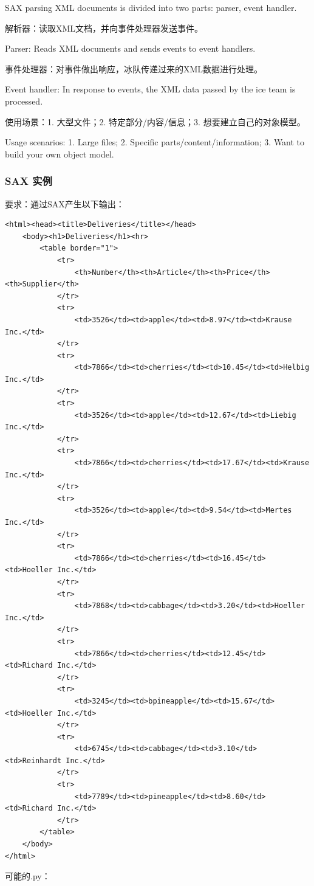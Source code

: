 \documentclass[fontset=windows]{article}
\begin{document}
SAX parsing XML documents is divided into two parts: parser, event handler.

解析器：读取XML文档，并向事件处理器发送事件。

Parser: Reads XML documents and sends events to event handlers.

事件处理器：对事件做出响应，冰队传递过来的XML数据进行处理。

Event handler: In response to events, the XML data passed by the ice team is processed.

使用场景：1. 大型文件；2. 特定部分/内容/信息；3. 想要建立自己的对象模型。

Usage scenarios: 1. Large files; 2. Specific parts/content/information; 3. Want to build your own object model.

\subsubsection{SAX 实例}

要求：通过SAX产生以下输出：

\begin{verbatim}
<html><head><title>Deliveries</title></head>
	<body><h1>Deliveries</h1><hr>
		<table border="1">
			<tr>
				<th>Number</th><th>Article</th><th>Price</th><th>Supplier</th>
			</tr>
			<tr>
				<td>3526</td><td>apple</td><td>8.97</td><td>Krause Inc.</td>
			</tr>
			<tr>
				<td>7866</td><td>cherries</td><td>10.45</td><td>Helbig Inc.</td> 
			</tr>
			<tr>
				<td>3526</td><td>apple</td><td>12.67</td><td>Liebig Inc.</td> 
			</tr>
			<tr>
				<td>7866</td><td>cherries</td><td>17.67</td><td>Krause Inc.</td> 
			</tr>
			<tr>
				<td>3526</td><td>apple</td><td>9.54</td><td>Mertes Inc.</td> 
			</tr>
			<tr>
				<td>7866</td><td>cherries</td><td>16.45</td><td>Hoeller Inc.</td> 
			</tr>
			<tr>
				<td>7868</td><td>cabbage</td><td>3.20</td><td>Hoeller Inc.</td> 
			</tr>
			<tr>
				<td>7866</td><td>cherries</td><td>12.45</td><td>Richard Inc.</td> 
			</tr>
			<tr>
				<td>3245</td><td>bpineapple</td><td>15.67</td><td>Hoeller Inc.</td> 
			</tr>
			<tr>
				<td>6745</td><td>cabbage</td><td>3.10</td><td>Reinhardt Inc.</td> 
			</tr>
			<tr>
				<td>7789</td><td>pineapple</td><td>8.60</td><td>Richard Inc.</td> 
			</tr>
		</table>
	</body>
</html>
\end{verbatim}

可能的.py：
\end{document}
